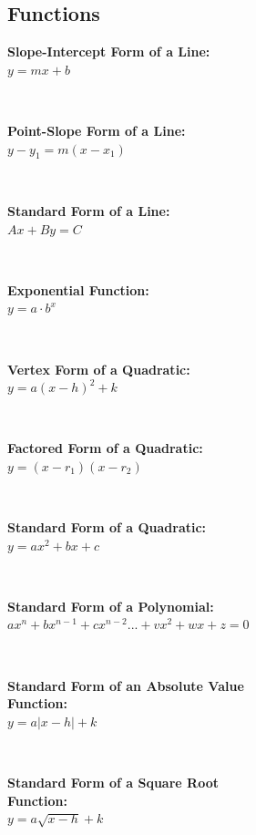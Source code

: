 \subsection*{Functions}
\begin{minipage}{\textwidth}
    \textbf{Slope-Intercept Form of a Line:}
    \\ \( y = mx + b \)
\end{minipage}
\\ \begin{minipage}{\textwidth}
    \textbf{Point-Slope Form of a Line:}
    \\ \( y - y_1 = m( x - x_1 ) \)
\end{minipage}
\\ \begin{minipage}{\textwidth}
    \textbf{Standard Form of a Line:}
    \\ \( Ax + By = C \)
\end{minipage}
\\ \begin{minipage}{\textwidth}
    \textbf{Exponential Function:}
    \\ \( y = a \cdot b^x \)
\end{minipage}
\\ \begin{minipage}{\textwidth}
    \textbf{Vertex Form of a Quadratic:}
    \\ \( y=  a( x - h )^2 + k \)
\end{minipage}
\\ \begin{minipage}{\textwidth}
    \textbf{Factored Form of a Quadratic:}
    \\ \( y = ( x - r_1 ) ( x - r_2 ) \)
\end{minipage}
\\ \begin{minipage}{\textwidth}
    \textbf{Standard Form of a Quadratic:}
    \\ \( y = ax^2 +bx + c \)
\end{minipage}
\\ \begin{minipage}{\textwidth}
    \textbf{Standard Form of a Polynomial:}
    \\ \( ax^n + bx^{n-1} + cx^{n-2}... + vx^2 + wx + z = 0 \)
\end{minipage}
\\ \begin{minipage}{\textwidth}
    \textbf{Standard Form of an Absolute Value \\Function:}
    \\ \( y = a| x - h | + k \)
\end{minipage}
\\ \begin{minipage}{\textwidth}
    \textbf{Standard Form of a Square Root \\Function:}
    \\ \( y = a \sqrt{ x - h } + k \)
\end{minipage}

